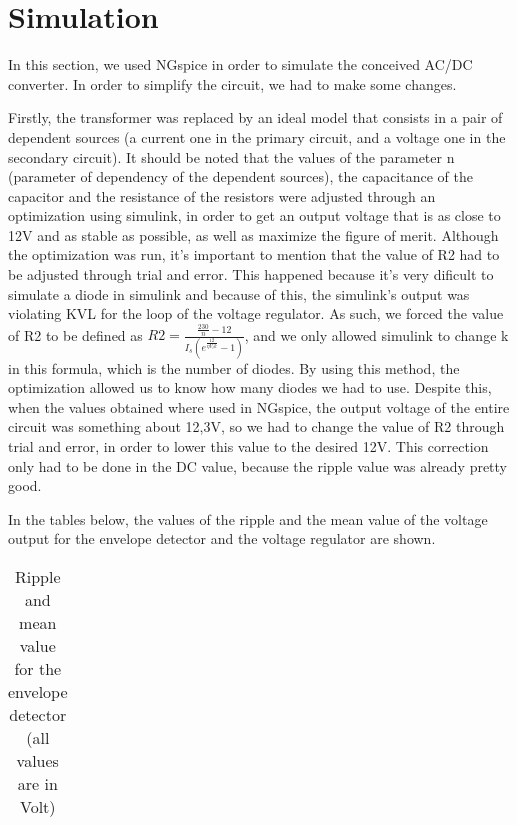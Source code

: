 \section{Simulation}
\label{sec:simulation}

\par In this section, we used NGspice in order to simulate the conceived AC/DC converter. In order to simplify the circuit, we had to make some changes.
\par Firstly, the transformer was replaced by an ideal model that consists in a pair of dependent sources (a current one in the primary circuit, and a voltage one in the secondary circuit). It should be noted that the values of the parameter n (parameter of dependency of the dependent sources), the capacitance of the capacitor and the resistance of the resistors were adjusted through an optimization using simulink, in order to get an output voltage that is as close to 12V and as stable as possible, as well as maximize the figure of merit. Although the optimization was run, it's important to mention that the value of R2 had to be adjusted through trial and error. This happened because it's very dificult to simulate a diode in simulink and because of this, the simulink's output was violating KVL for the loop of the voltage regulator. As such, we forced the value of R2 to be defined as $R2 = \frac{\frac{230}{n}-12}{I_s(e^{\frac{12}{\eta V_tk}}-1)}$, and we only allowed simulink to change k in this formula, which is the number of diodes. By using this method, the optimization allowed us to know how many diodes we had to use. Despite this, when the values obtained where used in NGspice, the output voltage of the entire circuit was something about 12,3V, so we had to change the value of R2 through trial and error, in order to lower this value to the desired 12V. This correction only had to be done in the DC value, because the ripple value was already pretty good.
\par In the tables below, the values of the ripple and the mean value of the voltage output for the envelope detector and the voltage regulator are shown.

\vspace{5mm}
\begin{table}[h!]
\centering
\begin{tabularx}{0.9\textwidth} {
  | >{\raggedright\arraybackslash}X
  | >{\raggedleft\arraybackslash}X | }
 \hline

\end{tabularx}
\caption{\label{tab:Table 4} Ripple and mean value for the envelope detector (all values are in Volt)}
\end{table}
\vspace{5mm}

